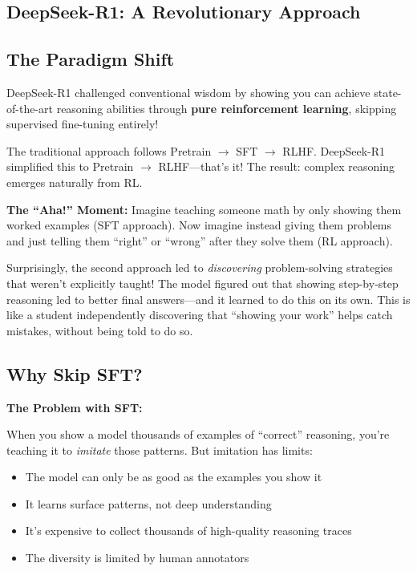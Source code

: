 \begin{chapterenv}

\chapter{DeepSeek-R1: A Revolutionary Approach}

\section{The Paradigm Shift}

\begin{tipbox}
DeepSeek-R1 challenged conventional wisdom by showing you can achieve state-of-the-art reasoning abilities through \textbf{pure reinforcement learning}, skipping supervised fine-tuning entirely!
\end{tipbox}

The traditional approach follows Pretrain $\to$ SFT $\to$ RLHF. DeepSeek-R1 simplified this to Pretrain $\to$ RLHF---that's it! The result: complex reasoning emerges naturally from RL.

\textbf{The ``Aha!'' Moment:} Imagine teaching someone math by only showing them worked examples (SFT approach). Now imagine instead giving them problems and just telling them ``right'' or ``wrong'' after they solve them (RL approach).

Surprisingly, the second approach led to \textit{discovering} problem-solving strategies that weren't explicitly taught! The model figured out that showing step-by-step reasoning led to better final answers---and it learned to do this on its own. This is like a student independently discovering that ``showing your work'' helps catch mistakes, without being told to do so.

\section{Why Skip SFT?}

\textbf{The Problem with SFT:}

When you show a model thousands of examples of ``correct'' reasoning, you're teaching it to \textit{imitate} those patterns. But imitation has limits:

\begin{itemize}[nosep]
    \item The model can only be as good as the examples you show it
    \item It learns surface patterns, not deep understanding
    \item It's expensive to collect thousands of high-quality reasoning traces
    \item The diversity is limited by human annotators
\end{itemize}


\end{chapterenv}
